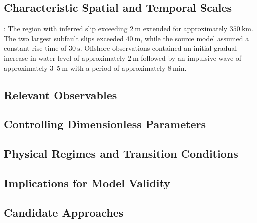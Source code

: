 \subsection{Characteristic Spatial and Temporal Scales}
\label{sec:res-phy-src-characteristic-spatial-temporal-scales}


\textcite{fujii2011tsunamisource}: The region with inferred slip exceeding $2~\mathrm{m}$ extended for approximately $350~\mathrm{km}$. The two largest subfault slips exceeded $40~\mathrm{m}$, while the source model assumed a constant rise time of $30~\mathrm{s}$. Offshore observations contained an initial gradual increase in water level of approximately $2~\mathrm{m}$ followed by an impulsive wave of approximately $3$--$5~\mathrm{m}$ with a period of approximately $8~\mathrm{min}$.

\subsection{Relevant Observables}
\label{sec:res-phy-src-relevant-observables}


\subsection{Controlling Dimensionless Parameters}
\label{sec:res-phy-src-controlling-dimensionless-parameters}


\subsection{Physical Regimes and Transition Conditions}
\label{sec:res-phy-src-physical-regimes-transition-conditions}


\subsection{Implications for Model Validity}
\label{sec:res-phy-src-model-validity-implications}


\subsection{Candidate Approaches}
\label{sec:res-phy-src-candidate-approaches}

